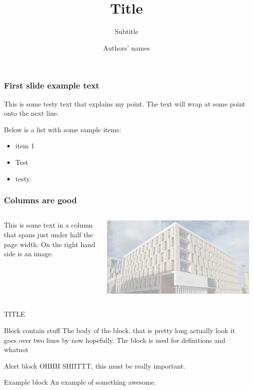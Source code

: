 \documentclass[aspectratio=169]{beamer}
\title{Title}
\subtitle{Subtitle}
\author{Authors' names}
\institute{Institute}
\begin{document}
\maketitle

\begin{frame}
  \frametitle{First slide example text}
  This is some testy text that explains my point. The text will wrap at some point onto the next line.

  Below is a list with some sample items:

  \begin{itemize}
    \item{item 1}
    \item{Test}
    \item{testy}
  \end{itemize}
\end{frame}

\begin{frame}
	\frametitle{Columns are good}
	\begin{columns}

		This is some text in a column that spans just under half the page width. On the right hand side is an image.

		\includegraphics[width=\textwidth]{background}
	\end{columns}
\end{frame}

\begin{frame}{TITLE}
	\begin{block}{Block contain stuff}
		The body of the block. that is pretty long actually look it goes over two lines by now hopefully. The block is used for definitions and whatnot
	\end{block}
	\begin{alertblock}{Alert block}
		OHHH SHIITTT, this must be really important.
	\end{alertblock}
	\begin{exampleblock}{Example block}
		An example of something awesome.
	\end{exampleblock}
\end{frame}
\end{document}
